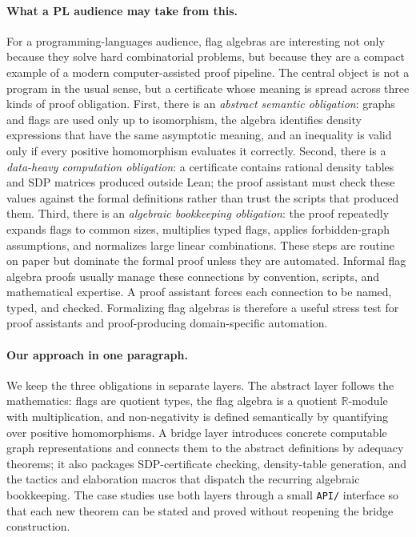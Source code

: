 \documentclass{article}
\begin{document}
\paragraph{What a PL audience may take from this.}
For a programming-languages audience, flag algebras are interesting not only
because they solve hard combinatorial problems, but because they are a
compact example of a modern computer-assisted proof pipeline.  The central
object is not a program in the usual sense, but a certificate whose meaning
is spread across three kinds of proof obligation.  First, there is an
\emph{abstract semantic obligation}: graphs and flags are used only up to
isomorphism, the algebra identifies density expressions that have the same
asymptotic meaning, and an inequality is valid only if every positive
homomorphism evaluates it correctly.  Second, there is a \emph{data-heavy
computation obligation}: a certificate contains rational density tables and
SDP matrices produced outside Lean; the proof assistant must check these
values against the formal definitions rather than trust the scripts that
produced them.  Third, there is an \emph{algebraic bookkeeping obligation}:
the proof repeatedly expands flags to common sizes, multiplies typed flags,
applies forbidden-graph assumptions, and normalizes large linear
combinations.  These steps are routine on paper but dominate the formal proof
unless they are automated.  Informal flag algebra proofs usually manage these
connections by convention, scripts, and mathematical expertise.  A proof
assistant forces each connection to be named, typed, and checked.
Formalizing flag algebras is therefore a useful stress test for proof
assistants and proof-producing domain-specific automation.

\paragraph{Our approach in one paragraph.}
We keep the three obligations in separate layers.  The abstract layer follows
the mathematics: flags are quotient types, the flag algebra is a quotient
$\mathbb{R}$-module with multiplication, and non-negativity is defined
semantically by quantifying over positive homomorphisms.  A bridge layer
introduces concrete computable graph representations and connects them to the
abstract definitions by adequacy theorems; it also packages SDP-certificate
checking, density-table generation, and the tactics and elaboration macros
that dispatch the recurring algebraic bookkeeping.  The case studies use both
layers through a small \texttt{API/} interface so that each new theorem can be
stated and proved without reopening the bridge construction.
\end{document}
